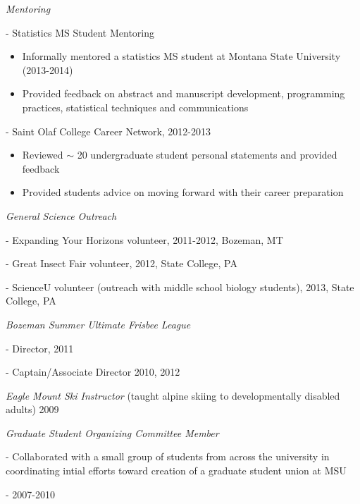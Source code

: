 \documentclass[9pt]{article}
\newenvironment{outerlist}[1][\enskip\textbullet]%
        {\begin{itemize}[#1]}{\end{itemize}%
         }
\newenvironment{innerlist}[1][\enskip\textbullet]%
        {\begin{compactitem}[#1]}{\end{compactitem}}
\begin{document}
	\begin{outerlist}
    \item[] \textit{Mentoring}
      \begin{innerlist}
        \item[-] Statistics MS Student Mentoring 
          \begin{itemize}
            \item Informally mentored a statistics MS student at Montana State
		    University (2013-2014)
            \item Provided feedback on abstract and manuscript development,
		    programming practices, statistical techniques and communications
          \end{itemize}
      \end{innerlist}
      \begin{innerlist}
        \item[-] Saint Olaf College Career Network, 2012-2013
          \begin{itemize}
            \item Reviewed $\sim$ 20 undergraduate student personal statements and provided feedback
            \item Provided students advice on moving forward with their career preparation
          \end{itemize}
      \end{innerlist}
    \item[] \textit{General Science Outreach}
      \begin{innerlist}
        \item[-] Expanding Your Horizons volunteer, 2011-2012, Bozeman, MT
        \item[-] Great Insect Fair volunteer, 2012, State College, PA
        \item[-] ScienceU volunteer (outreach with middle school biology
		students), 2013, State College, PA
      \end{innerlist}
		\item[] \textit{Bozeman Summer Ultimate Frisbee League}
      \begin{innerlist}
        \item[-] Director, 2011
        \item[-] Captain/Associate Director 2010, 2012
      \end{innerlist}
\item[] \textit{Eagle Mount Ski Instructor} (taught alpine skiing to developmentally disabled adults) 2009
		\item[] \textit{Graduate Student Organizing Committee Member} 
      \begin{innerlist}
        \item[-] Collaborated with a small group of students from across the university in coordinating intial efforts toward creation of a graduate student union at MSU
        \item[-] 2007-2010
			\end{innerlist}
	\end{outerlist}
  
\end{document}
